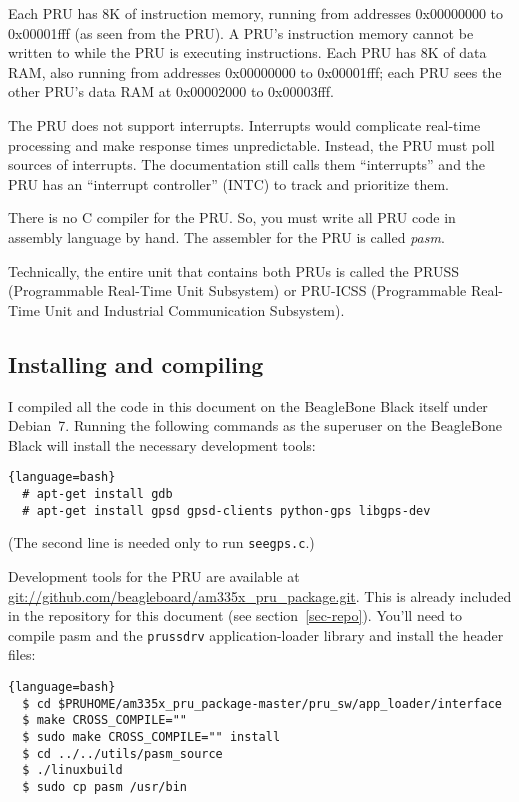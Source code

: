 \documentclass[letterpaper,11pt,fleqn]{article}
\begin{document}
Each PRU has 8K of instruction memory, running from addresses  0x00000000 to
0x00001fff (as seen from the PRU). A PRU's instruction memory cannot be
written to while the PRU is executing instructions. Each PRU has 8K of data
RAM, also running from addresses 0x00000000 to 0x00001fff; each PRU sees the
other PRU's data RAM at 0x00002000 to 0x00003fff.

The PRU does not support interrupts. Interrupts would complicate real-time
processing and make response times unpredictable. Instead, the PRU must poll
sources of interrupts. The documentation still calls them ``interrupts'' and 
the PRU has an ``interrupt controller'' (INTC) to track and prioritize them.

There is no C compiler for the PRU. So, you must write all PRU code in
assembly language by hand. The assembler for the PRU is called \textit{pasm}.

Technically, the entire unit that contains both PRUs is called the PRUSS
(Programmable Real-Time Unit Subsystem) or \mbox{PRU-ICSS} (Programmable
Real-Time Unit and Industrial Communication Subsystem).

\subsection{Installing and compiling}

I compiled all the code in this document on the BeagleBone Black itself under
Debian~7. Running the following commands as the superuser on the BeagleBone
Black will install the necessary development tools:

\begin{lstlisting}{language=bash}
  # apt-get install gdb
  # apt-get install gpsd gpsd-clients python-gps libgps-dev
\end{lstlisting}

\noindent
(The second line is needed only to run \texttt{seegps.c}.)

Development tools for the PRU are available at
\url{git://github.com/beagleboard/am335x\_pru\_package.git}. This is already
included in the repository for this document (see section~\ref{sec-repo}).
You'll need to compile pasm and the \texttt{prussdrv} application-loader
library and install the header files:

\begin{lstlisting}{language=bash}
  $ cd $PRUHOME/am335x_pru_package-master/pru_sw/app_loader/interface
  $ make CROSS_COMPILE=""
  $ sudo make CROSS_COMPILE="" install
  $ cd ../../utils/pasm_source
  $ ./linuxbuild
  $ sudo cp pasm /usr/bin
\end{lstlisting}
\end{document}
